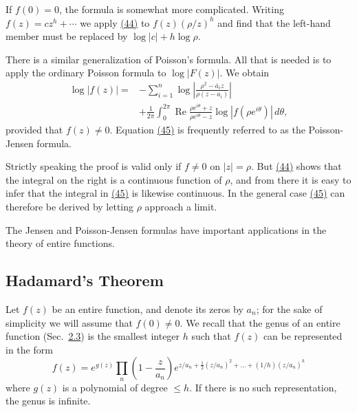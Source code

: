 If $f(0) = 0$, the formula is somewhat more complicated. Writing $f(z) = cz^h + \cdots$ we apply \hyperref[eq:5.44]{(44)} to $f(z)(\rho / z)^h$ and find that the left-hand member must be replaced by $\log |c| + h \log \rho$.

There is a similar generalization of Poisson's formula. All that is needed is to apply the ordinary Poisson formula to $\log |F(z)|$. We obtain
\begin{equation*}
\begin{aligned}
\log|f(z)|={}&-\sum_{i=1}^n\log\left|\frac{\rho^2-\bar a_i z}{\rho(z-a_i)}\right|\\
&+\frac1{2\pi}\int_0^{2\pi}\operatorname{Re}
\frac{\rho e^{i\theta}+z}{\rho e^{i\theta}-z}\log|f(\rho e^{i\theta})|\,d\theta,
\end{aligned}\tag{45}\label{eq:5.45}
\end{equation*}
provided that $f(z) \neq 0$. Equation \hyperref[eq:5.45]{(45)} is frequently referred to as the Poisson-Jensen formula.

Strictly speaking the proof is valid only if $f \neq 0$ on $|z| = \rho$. But \hyperref[eq:5.44]{(44)} shows that the integral on the right is a continuous function of $\rho$, and from there it is easy to infer that the integral in \hyperref[eq:5.45]{(45)} is likewise continuous. In the general case \hyperref[eq:5.45]{(45)} can therefore be derived by letting $\rho$ approach a limit.

The Jensen and Poisson-Jensen formulas have important applications in the theory of entire functions.

\setcounter{section}{3}\setcounter{subsection}{1}\subsection{Hadamard's Theorem}\label{sec:5.3.2}
Let $f(z)$ be an entire function, and denote its zeros by $a_{n}$; for the sake of simplicity we will assume that $f(0) \neq 0$. We recall that the genus of an entire function (Sec.~\hyperref[sec:5.2.3]{2.3}) is the smallest integer $h$ such that $f(z)$ can be represented in the form
\begin{equation*}
f (z) = e ^ {g (z)} \prod_ {n} \left(1 - \frac {z}{a _ {n}}\right) e ^ {z / a _ {n} + \frac {1}{2} (z / a _ {n}) ^ {2} + \dots + (1 / h) (z / a _ {n}) ^ {h}}\tag{46}\label{eq:5.46}
\end{equation*}
where $g(z)$ is a polynomial of degree $\leq h$. If there is no such representation, the genus is infinite.

